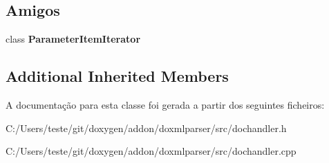 \subsection*{Amigos}
\begin{DoxyCompactItemize}
\item 
\hypertarget{class_parameter_item_handler_a5084664195c4e350e777e905f6f66caa}{class {\bfseries Parameter\-Item\-Iterator}}\label{class_parameter_item_handler_a5084664195c4e350e777e905f6f66caa}

\end{DoxyCompactItemize}
\subsection*{Additional Inherited Members}


A documentação para esta classe foi gerada a partir dos seguintes ficheiros\-:\begin{DoxyCompactItemize}
\item 
C\-:/\-Users/teste/git/doxygen/addon/doxmlparser/src/dochandler.\-h\item 
C\-:/\-Users/teste/git/doxygen/addon/doxmlparser/src/dochandler.\-cpp\end{DoxyCompactItemize}
